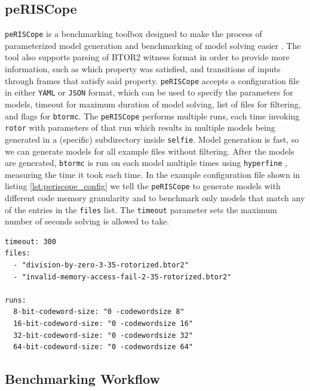 \documentclass[12pt]{article}
\begin{document}
\subsection{peRISCope}

\texttt{peRISCope} is a benchmarking toolbox designed to make the process of 
parameterized model generation and benchmarking of model solving easier
\cite{Fejzic_peRISCope}. The tool also supports parsing of BTOR2 witness format
in order to provide more information, such as which property was satisfied, and
transitions of inputs through frames that satisfy said property.
\texttt{peRISCope} accepts a configuration file in either \texttt{YAML} or
\texttt{JSON} format, which can be used to specify the parameters for models,
timeout for maximum duration of model solving, list of files for filtering, and
flags for \texttt{btormc}. The \texttt{peRISCope} performs multiple runs,
each time invoking \texttt{rotor} with parameters of that run which results in
multiple models being generated in a (specific) subdirectory inside
\texttt{selfie}. Model generation is fast, so we can generate models for all
example files without filtering. After the models are generated,
\texttt{btormc} is run on each model multiple times using \texttt{hyperfine}
\cite{Peter_hyperfine_2023}, measuring the time it took each time. In the
example configuration file shown in listing \ref{lst:periscope_config} we tell
the \texttt{peRISCope} to generate models with different code memory
granularity and to benchmark only models that match any of the entries in the
\texttt{files} list. The \texttt{timeout} parameter sets the maximum number of
seconds solving is allowed to take.

\begin{lstlisting}[label=lst:periscope_config, caption={Example peRISCope
                configuration file in \texttt{YAML} format}, captionpos=b]
timeout: 300
files:
  - "division-by-zero-3-35-rotorized.btor2"
  - "invalid-memory-access-fail-2-35-rotorized.btor2"

runs:
  8-bit-codeword-size: "0 -codewordsize 8"
  16-bit-codeword-size: "0 -codewordsize 16"
  32-bit-codeword-size: "0 -codewordsize 32"
  64-bit-codeword-size: "0 -codewordsize 64"
\end{lstlisting}

\subsection{Benchmarking Workflow}
\end{document}
